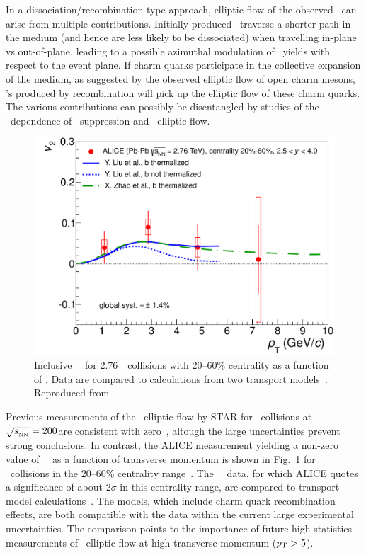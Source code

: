 In a dissociation/recombination type approach, elliptic flow of the observed \jpsi\ can 
arise from multiple contributions. Initially produced \jpsi\ traverse a shorter path 
in the medium (and hence are less likely to be dissociated) when travelling in-plane vs 
out-of-plane, leading to a possible azimuthal modulation of \jpsi\ yields with respect 
to the event plane. If charm quarks participate in the collective expansion of the medium, as
suggested by the observed elliptic flow of open charm mesons, \jpsi's produced by recombination will
pick up the elliptic flow of these charm quarks. The various contributions can possibly be disentangled 
by studies of the \pT\ dependence of \jpsi\ suppression and \jpsi\ elliptic flow.

\begin{figure}
\begin{center}
\includegraphics[width=0.49\linewidth]{qqbarfigures/prl_fig4-eps-converted-to.pdf}
\caption{\label{fig:GR:v2ptcomp} Inclusive \jpsi\ \vtwo\
for 2.76\TeV\ \PbPb\ collisions with 20--60\% centrality as a function of \pT.
Data are compared to calculations from two transport models~\cite{Liu:2009gx,Zhao:2012gc}. 
Reproduced from~\cite{ALICE:2013xna}}
\end{center}
\end{figure}
Previous measurements of the \jpsi\ elliptic flow by STAR for \AuAu\ collisions at 
$\sqrt{s_{_{\rm NN}}} = 200$\GeV are consistent with zero~\cite{Adamczyk:2012pw}, 
altough the large uncertainties prevent strong conclusions.
In contrast, the ALICE measurement yielding a non-zero value of \jpsi\ \vtwo\ as a function 
of transverse momentum is shown in Fig.~\ref{fig:GR:v2ptcomp} for \PbPb\ collisions in the 20--60\% 
centrality range~\cite{ALICE:2013xna}.
The \jpsi\ \vtwo\ data, for which ALICE quotes a significance of about 2$\sigma$ in this centrality range, 
are compared to transport model calculations~\cite{Liu:2009gx,Zhao:2012gc}. 
The models, which include charm quark recombination effects,
are both compatible with the data within the current large experimental uncertainties. 
The comparison points to the importance of future high statistics measurements 
of \jpsi\ elliptic flow at high transverse momentum ($\mbox{$p_{\mathrm{T}}$} > 5$\GeVc).

